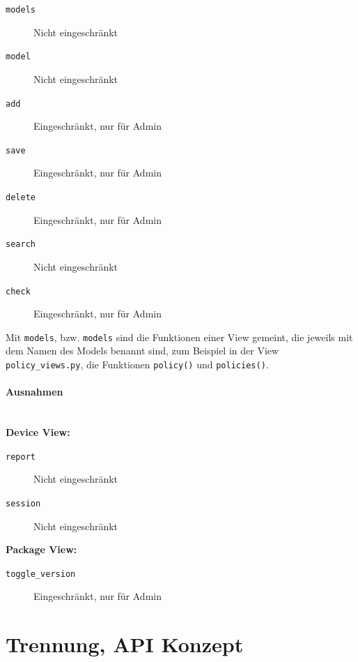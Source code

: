 \begin{description}
    \item [\texttt{models}] Nicht eingeschränkt
    \item [\texttt{model}] Nicht eingeschränkt
    \item [\texttt{add}] Eingeschränkt, nur für Admin
    \item [\texttt{save}] Eingeschränkt, nur für Admin
    \item [\texttt{delete}] Eingeschränkt, nur für Admin
    \item [\texttt{search}] Nicht eingeschränkt
    \item [\texttt{check}] Eingeschränkt, nur für Admin
\end{description}

Mit \texttt{models}, bzw. \texttt{models} sind die Funktionen einer View gemeint, die jeweils mit dem
Namen des Models benannt sind, zum Beispiel in der View \texttt{policy\_views.py}, die Funktionen
\texttt{policy()} und \texttt{policies()}.

\paragraph{Ausnahmen} \hspace{0pt} \\

\textbf{Device View:}
\begin{description}
    \item [\texttt{report} ] Nicht eingeschränkt
    \item [\texttt{session} ] Nicht eingeschränkt
\end{description}

\textbf{Package View:}
\begin{description}
    \item [\texttt{toggle\_version}] Eingeschränkt, nur für Admin
\end{description}



\section{Trennung, API Konzept}

